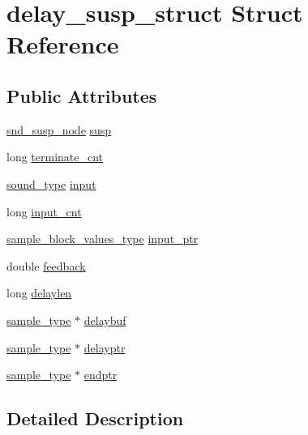 \hypertarget{structdelay__susp__struct}{}\section{delay\+\_\+susp\+\_\+struct Struct Reference}
\label{structdelay__susp__struct}
\subsection*{Public Attributes}
\begin{DoxyCompactItemize}
\item 
\hyperlink{sound_8h_a6b268203688a934bd798ceb55f85d4c0}{snd\+\_\+susp\+\_\+node} \hyperlink{structdelay__susp__struct_ae01a96827e63900ea74e1fd1656f7555}{susp}
\item 
long \hyperlink{structdelay__susp__struct_ae2c6aa034cfa2eaf1eac74fc77bd49b8}{terminate\+\_\+cnt}
\item 
\hyperlink{sound_8h_a792cec4ed9d6d636d342d9365ba265ea}{sound\+\_\+type} \hyperlink{structdelay__susp__struct_a3c6313c5372a74699f0e565e4261272a}{input}
\item 
long \hyperlink{structdelay__susp__struct_a18ba1459a54f13cac49f5a5d25e8a976}{input\+\_\+cnt}
\item 
\hyperlink{sound_8h_a83d17f7b465d1591f27cd28fc5eb8a03}{sample\+\_\+block\+\_\+values\+\_\+type} \hyperlink{structdelay__susp__struct_a1284a8b44186da846294df8c82e1d7a1}{input\+\_\+ptr}
\item 
double \hyperlink{structdelay__susp__struct_a86a44e76783dc3c926d9e97256f495a7}{feedback}
\item 
long \hyperlink{structdelay__susp__struct_aa4e0b3bb633c2394c801875a02e8493a}{delaylen}
\item 
\hyperlink{sound_8h_a3a9d1d4a1c153390d2401a6e9f71b32c}{sample\+\_\+type} $\ast$ \hyperlink{structdelay__susp__struct_aafc2a56a784722ca0a4bf7a387a270b3}{delaybuf}
\item 
\hyperlink{sound_8h_a3a9d1d4a1c153390d2401a6e9f71b32c}{sample\+\_\+type} $\ast$ \hyperlink{structdelay__susp__struct_ae00f926bff77a7dbd3f4bf0429138ee1}{delayptr}
\item 
\hyperlink{sound_8h_a3a9d1d4a1c153390d2401a6e9f71b32c}{sample\+\_\+type} $\ast$ \hyperlink{structdelay__susp__struct_a513152deb31953215962b8ef253059e5}{endptr}
\end{DoxyCompactItemize}


\subsection{Detailed Description}


